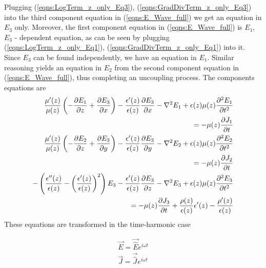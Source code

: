 \documentclass[12pt,twoside]{report}
\begin{document}
Plugging (\ref{eqns:LogTerm_z_only_Eq3}), (\ref{eqns:GradDivTerm_z_only_Eq3}) into the third component equation in (\ref{eqns:E_Wave_full}) we get an equation in $E_3$ only. Moreover, the first component equation in (\ref{eqns:E_Wave_full}) is $E_1$, $E_3$ - dependent equation, as can be seen by plugging (\ref{eqns:LogTerm_z_only_Eq1}), (\ref{eqns:GradDivTerm_z_only_Eq1}) into it. Since $E_3$ can be found independently, we have an equation in $E_1$. Similar reasoning yields an equation in $E_2$ from the second component equation in (\ref{eqns:E_Wave_full}), thus completing an uncoupling process. The components equations are
\begin{subequations}
\begin{align}
\label{eqns:Generalized_wave_z_coeffs_Eq1}
\dfrac{\mu'(z)}{\mu(z)}\left( -\dfrac{\partial E_1}{\partial z} + \dfrac{\partial E_3}{\partial x}\right)-\dfrac{\epsilon'(z)}{\epsilon(z)}\dfrac{\partial E_3}{\partial x}-\nabla^2 E_1 +\epsilon(z) \mu(z)\dfrac{\partial^2 E_1}{\partial t^2} &\\ 
=-\mu(z)\dfrac{\partial J_1}{\partial t}		\notag\\
\label{eqns:Generalized_wave_z_coeffs_Eq2}
\dfrac{\mu'(z)}{\mu(z)}\left( -\dfrac{\partial E_2}{\partial z} + \dfrac{\partial E_3}{\partial y}\right)-\dfrac{\epsilon'(z)}{\epsilon(z)}\dfrac{\partial E_3}{\partial y}-\nabla^2 E_2 + \epsilon(z) \mu(z)\dfrac{\partial^2 E_2}{\partial t^2} &\\
= -\mu(z)\dfrac{\partial J_2}{\partial t} \notag\\
\label{eqns:Generalized_wave_z_coeffs_Eq3}	
-\left( \dfrac{\epsilon''(z)}{\epsilon(z)}-\left( \dfrac{\epsilon'(z)}{\epsilon(z)}\right)^2 \right)E_3 -\dfrac{\epsilon'(z)}{\epsilon(z)}\dfrac{\partial E_3}{\partial z} - \nabla^2 E_3 +\epsilon(z) \mu(z)\dfrac{\partial^2 E_3}{\partial t^2} &\\
= -\mu(z)\dfrac{\partial J_3}{\partial t} + \dfrac{\rho(z)}{\epsilon(z)}\epsilon'(z) - \dfrac{\rho'(z)}{\epsilon(z)} \notag 
\end{align}
\end{subequations}
These equations are transformed in the time-harmonic case

\begin{subequations}
\begin{align}
\label{eqns:time-harmonic-E-field-trasns}
 \overrightarrow{E} = \overrightarrow{\hat{E}}e^{i \omega t}\\
\label{eqns:time-harmonic-J-current-trasns}
  \overrightarrow{J} = \overrightarrow{\hat{J}}e^{i \omega t}
\end{align}
\end{subequations}
\end{document}
